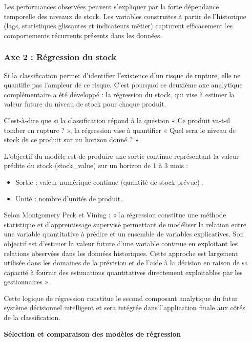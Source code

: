 Les performances observées peuvent s'expliquer par la forte dépendance temporelle des niveaux de stock. Les variables construites à partir de l'historique (lags, statistiques glissantes et indicateurs métier) capturent efficacement les comportements récurrents présents dans les données.
 
\subsubsection{Axe 2 : Régression du stock}
 
Si la classification permet d'identifier l'existence d'un risque de rupture, elle ne quantifie pas l'ampleur de ce risque. C'est pourquoi ce deuxième axe analytique complémentaire a été développé : la régression du stock, qui vise à estimer la valeur future du niveau de stock pour chaque produit.
 
C'est-à-dire que si la classification répond à la question « Ce produit va-t-il tomber en rupture ? », la régression vise à quantifier « Quel sera le niveau de stock de ce produit sur un horizon donné ? »
 
L'objectif du modèle est de produire une sortie continue représentant la valeur prédite du stock (stock\_value) sur un horizon de 1 à 3 mois :
 
\begin{itemize}
    \item Sortie : valeur numérique continue (quantité de stock prévue) ;
    \item Unité : nombre d'unités de produit.
\end{itemize}
 
Selon Montgomery Peck et Vining \cite{montgomery2021}: « la régression constitue une méthode statistique et d’apprentissage supervisé permettant de modéliser la relation entre une variable quantitative à prédire et un ensemble de variables explicatives. Son objectif est d'estimer la valeur future d'une variable continue en exploitant les relations observées dans les données historiques. Cette approche est largement utilisée dans les domaines de la prévision et de l'aide à la décision en raison de sa capacité à fournir des estimations quantitatives directement exploitables par les gestionnaires » 
 
Cette logique de régression constitue le second composant analytique du futur système décisionnel intelligent et sera intégrée dans l'application finale aux côtés de la classification.
 
\textbf{Sélection et comparaison des modèles de régression}
 
